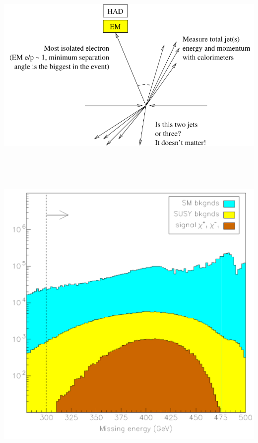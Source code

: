 \documentclass[landscape]{article}
\begin{document}
\huge
\renewcommand{\labelitemi}{-}
\setlength{\parindent}{0 cm}

\mbox{ }

\vfill

\begin{center}
  \includegraphics[width=\linewidth]{explain.pdf}
\end{center}

\vfill

\mbox{ }

\pagebreak

\mbox{ }

\vfill

\begin{center}
  \includegraphics[width=0.7\linewidth]{allnew_1.pdf}
\end{center}

\vfill

\mbox{ }

\pagebreak
\end{document}
